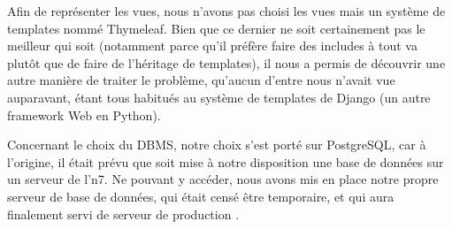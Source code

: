 \documentclass[10pt]{scrartcl}
\begin{document}
    Afin de représenter les vues, nous n'avons pas choisi les vues
    mais un système de templates nommé Thymeleaf. Bien que ce dernier
    ne soit certainement pas le meilleur qui soit (notamment parce
    qu'il préfère faire des includes à tout va plutôt que de faire de
    l'héritage de templates), il nous a permis de découvrir une autre
    manière de traiter le problème, qu'aucun d'entre nous n'avait vue
    auparavant, étant tous habitués au système de templates de Django
    (un autre framework Web en Python).

    Concernant le choix du DBMS, notre choix s'est porté sur
    PostgreSQL, car à l'origine, il était prévu que soit mise à notre
    disposition une base de données sur un serveur de l'n7. Ne pouvant
    y accéder, nous avons mis en place notre propre serveur de base de
    données, qui était censé être temporaire, et qui aura finalement
    servi de serveur de \og production \fg.
\end{document}

